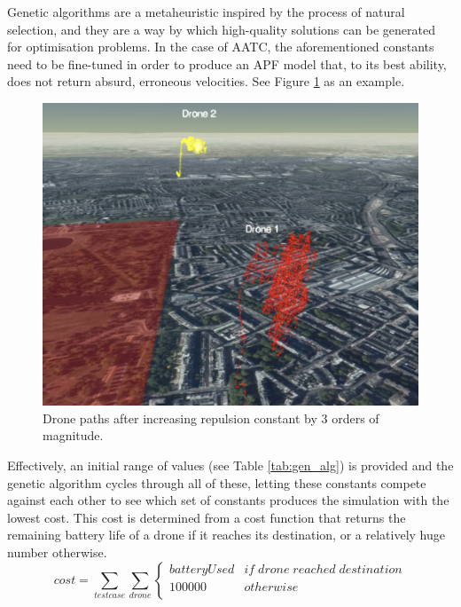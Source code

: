 \documentclass[a4paper,12pt,titlepage]{article}
\begin{document}
Genetic algorithms are a metaheuristic inspired by the process of natural selection, and they are a way by which high-quality solutions can be generated for optimisation problems\cite{Mitchell1996}. In the case of AATC, the aforementioned constants need to be fine-tuned in order to produce an APF model that, to its best ability, does not return absurd, erroneous velocities. See Figure \ref{fig:aatc_spaghett} as an example. \\

\begin{figure}[!hbpt]
  \center
  \includegraphics[width=\linewidth]{img/aatc_spaghett.jpg}
  \caption{Drone paths after increasing repulsion constant by 3 orders of magnitude.}
  \label{fig:aatc_spaghett}
\end{figure}

Effectively, an initial range of values (see Table \ref{tab:gen_alg}) is provided and the genetic algorithm cycles through all of these, letting these constants compete against each other to see which set of constants produces the simulation with the lowest cost. This cost is determined from a cost function that returns the remaining battery life of a drone if it reaches its destination, or a relatively huge number otherwise.
$$cost = \sum_{testcase} \sum_{drone}
    \begin{cases}
      batteryUsed & if \; drone \; reached \; destination    \\
      100000 & otherwise \\

   \end{cases}$$
\end{document}
